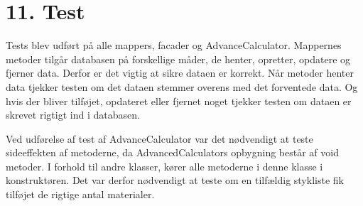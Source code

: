\documentclass[11pt]{report}
\begin{document}
\chapter*{11. Test}
Tests blev udført på alle mappers, facader og AdvanceCalculator. Mappernes metoder tilgår databasen på forskellige måder, de henter, opretter, opdatere og fjerner data. Derfor er det vigtig at sikre dataen er korrekt.
Når metoder henter data tjekker testen om det dataen stemmer overens med det forventede data. Og hvis der bliver tilføjet, opdateret eller fjernet noget tjekker testen om dataen er skrevet rigtigt ind i databasen.

Ved udførelse af test af AdvanceCalculator var det nødvendigt at teste sideeffekten af metoderne, da AdvancedCalculators opbygning består af void metoder. I forhold til andre klasser, kører alle metoderne i denne klasse i konstruktøren. Det var derfor nødvendigt at teste om en tilfældig stykliste fik tilføjet de rigtige antal materialer.
\end{document}
